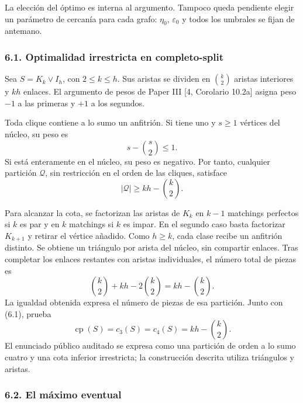 \documentclass[spanish,11pt,a4paper]{article}
\begin{document}
La elección del óptimo es interna al argumento. Tampoco queda pendiente elegir un parámetro de cercanía para cada grafo: \(\eta_0\), \(\varepsilon_0\) y todos los umbrales se fijan de antemano.

\subsubsection{6.1. Optimalidad irrestricta en completo-split}\label{optimalidad-irrestricta-en-completo-split}

Sea \(S=K_k\vee I_h\), con \(2\le k\le h\). Sus aristas se dividen en \(\binom k2\) aristas interiores y \(kh\) enlaces. El argumento de pesos de Paper III {[}4, Corolario 10.2a{]} asigna peso \(-1\) a las primeras y \(+1\) a los segundos.

Toda clique contiene a lo sumo un anfitrión. Si tiene uno y \(s\ge1\) vértices del núcleo, su peso es \[
s-\binom s2\le1.
\] Si está enteramente en el núcleo, su peso es negativo. Por tanto, cualquier partición \(\mathcal Q\), sin restricción en el orden de las cliques, satisface \[
|\mathcal Q|\ge kh-\binom k2.
\tag{6.1}
\]

Para alcanzar la cota, se factorizan las aristas de \(K_k\) en \(k-1\) matchings perfectos si \(k\) es par y en \(k\) matchings si \(k\) es impar. En el segundo caso basta factorizar \(K_{k+1}\) y retirar el vértice añadido. Como \(h\ge k\), cada clase recibe un anfitrión distinto. Se obtiene un triángulo por arista del núcleo, sin compartir enlaces. Tras completar los enlaces restantes con aristas individuales, el número total de piezas es \[
\binom k2+kh-2\binom k2=kh-\binom k2.
\] La igualdad obtenida expresa el número de piezas de esa partición. Junto con (6.1), prueba \[
\operatorname{cp}(S)=c_3(S)=c_4(S)=kh-\binom k2.
\tag{6.2}
\] El enunciado público auditado se expresa como una partición de orden a lo sumo cuatro y una cota inferior irrestricta; la construcción descrita utiliza triángulos y aristas.

\subsubsection{6.2. El máximo eventual}\label{el-maximo-eventual}
\end{document}
